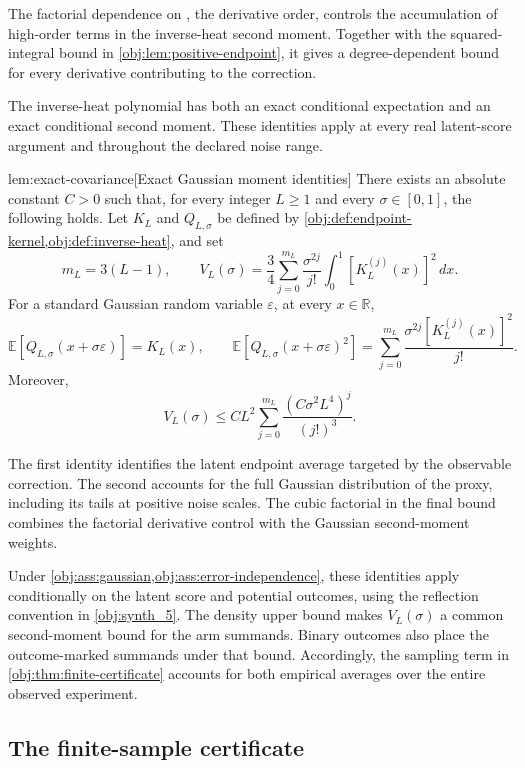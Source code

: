The factorial dependence on , the derivative order, controls the accumulation of high-order terms in the inverse-heat second moment. Together with the squared-integral bound in \cref{obj:lem:positive-endpoint}, it gives a degree-dependent bound for every derivative contributing to the correction.

The inverse-heat polynomial has both an exact conditional expectation and an exact conditional second moment. These identities apply at every real latent-score argument and throughout the declared noise range.

\begin{lemmav}{lem:exact-covariance}[Exact Gaussian moment identities]
There exists an absolute constant \(C>0\) such that, for every integer \(L\ge1\) and every \(\sigma\in[0,1]\), the following holds. Let \(K_L\) and \(Q_{L,\sigma}\) be defined by \cref{obj:def:endpoint-kernel,obj:def:inverse-heat}, and set
\[
m_L=3(L-1),\qquad
V_L(\sigma)=\frac34\sum_{j=0}^{m_L}\frac{\sigma^{2j}}{j!}
\int_0^1 [K_L^{(j)}(x)]^2\,dx.
\]
For a standard Gaussian random variable \(\varepsilon\), at every \(x\in\mathbb R\),
\[
\mathbb E\!\left[Q_{L,\sigma}(x+\sigma\varepsilon)\right]=K_L(x),
\qquad
\mathbb E\!\left[Q_{L,\sigma}(x+\sigma\varepsilon)^2\right]
=\sum_{j=0}^{m_L}\frac{\sigma^{2j}[K_L^{(j)}(x)]^2}{j!}.
\]
Moreover,
\[
V_L(\sigma)\le C L^2
\sum_{j=0}^{m_L}\frac{(C\sigma^2L^4)^j}{(j!)^3}.
\]
\end{lemmav}

The first identity identifies the latent endpoint average targeted by the observable correction. The second accounts for the full Gaussian distribution of the proxy, including its tails at positive noise scales. The cubic factorial in the final bound combines the factorial derivative control with the Gaussian second-moment weights.

Under \cref{obj:ass:gaussian,obj:ass:error-independence}, these identities apply conditionally on the latent score and potential outcomes, using the reflection convention in \cref{obj:synth_5}. The density upper bound makes \(V_L(\sigma)\) a common second-moment bound for the arm summands. Binary outcomes also place the outcome-marked summands under that bound. Accordingly, the sampling term in \cref{obj:thm:finite-certificate} accounts for both empirical averages over the entire observed experiment.

\subsection{The finite-sample certificate}

